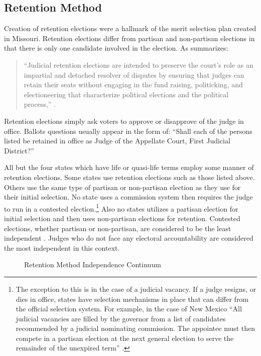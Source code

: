 \documentclass[12pt]{article}
\begin{document}
\subsection*{Retention Method}
Creation of retention elections were a hallmark of the merit selection plan created in Missouri. Retention elections differ from partisan and non-partisan elections in that there is only one candidate involved in the election. As \citeauthor{Reid1999} summarizes: \begin{quote}``Judicial retention elections are intended to preserve the court’s role as an impartial and detached resolver of disputes by ensuring that judges can retain their seats without engaging in the fund raising, politicking, and electioneering that characterize political elections and the political process,'' \citep[68]{Reid1999}.\end{quote}  Retention elections simply ask voters to approve or disapprove of the judge in office. Ballots questions usually appear in the form of: ``Shall each of the persons listed be retained in office as Judge of the Appellate Court, First Judicial District?''

All but the four states which have life or quasi-life terms employ some manner of retention elections. Some states use retention elections such as those listed above. Others use the same type of partisan or non-partisan election as they use for their initial selection. No state uses a commission system then requires the judge to run in a contested election.\footnote{The exception to this is in the case of a judicial vacancy.  If a judge resigns, or dies in office, states have selection mechanisms in place that can differ from the official selection system.  For example, in the case of New Mexico ``All judicial vacancies are filled by the governor from a list of candidates recommended by a judicial nominating commission. The appointee must then compete in a partisan election at the next general election to serve the remainder of the unexpired term'' \citep{AJS}.}  Also no states utilizes a partisan election for initial selection and then uses non-partisan elections for retention.  Contested elections, whether partisan or non-partisan, are considered to be the least independent \citep{Choi2010,ABA2003,Canes-Wrone2012}. Judges who do not face any electoral accountability are considered the most independent in this context.

\begin{figure}[tbh]\centering\caption{Retention Method Independence Continuum}\label{retentioncontinuum}
\end{figure}
\end{document}
